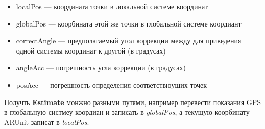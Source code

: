 \documentclass[a4paper, 11pt, titlepage]{article}
\begin{document}
        \begin{center}
        \end{center}

        \begin{itemize}
            \item localPos --- координата точки в локальной системе координат
            \item globalPos --- коорбината этой же точки в глобальной системе коордиант
            \item correctAngle --- предполагаемый угол коррекции между для приведения одной системы координат к другой (в градусах) 
            \item angleAcc --- погрешность угла коррекции (в градусах)
            \item posAcc --- погрешность определения соответствюущих точек 
        \end{itemize}

        Получть \textbf{Estimate} монжно разными путями, например перевести показания GPS в глобальную систмеу коордиан и записать в \textit{globalPos},
        а текущую коорбинату ARUnit записат в \textit{localPos}. 

        
\end{document}
